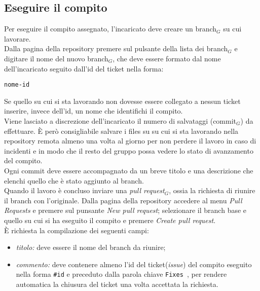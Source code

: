 \subsection{Eseguire il compito}
Per eseguire il compito assegnato, l'incaricato deve creare un branch$_G$ su cui lavorare. \\
Dalla pagina della repository premere sul pulsante della lista dei branch$_G$ e digitare il nome del nuovo branch$_G$, che deve essere formato dal nome dell'incaricato seguito dall'id del ticket nella forma: 
\begin{verbatim}
nome-id
\end{verbatim}
Se quello su cui si sta lavorando non dovesse essere collegato a nessun ticket inserire, invece dell'id, un nome che identifichi il compito. \\
Viene lasciato a discrezione dell'incaricato il numero di salvataggi (commit$_G$) da effettuare. È però consigliabile salvare i files su su cui si sta lavorando nella repository remota almeno una volta al giorno per non perdere il lavoro in caso di incidenti e in modo che il resto del gruppo possa vedere lo stato di avanzamento del compito. \\
Ogni commit deve essere accompagnato da un breve titolo e una descrizione che elenchi quello che è stato aggiunto al branch. \\
Quando il lavoro è concluso inviare una \textit{pull request}$_G$, ossia la richiesta di riunire il branch con l'originale. Dalla pagina della repository accedere al menu \textit{Pull Requests} e premere sul punsante \textit{New pull request}; selezionare il branch base e quello su cui si ha eseguito il compito e premere \textit{Create pull request}.\\ È richiesta la compilazione dei seguenti campi:
\begin{itemize}
    \item \textit{titolo:} deve essere il nome del branch da riunire;
    \item \textit{commento:} deve contenere almeno l'id del ticket(\textit{issue}) del compito eseguito nella forma \texttt{\#id} e preceduto dalla parola chiave \texttt{Fixes }, per rendere automatica la chiusura del ticket una volta accettata la richiesta. 
\end{itemize}

